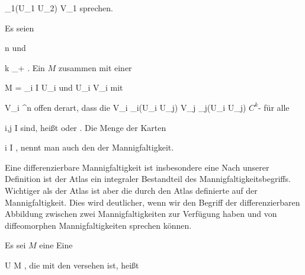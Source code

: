 \mavergleichskette
{\vergleichskette
{ \alpha_1(U_1 \cap U_2)
}
{ \subseteq }{ V_1
}
{  }{
}
{    }{
}
{   }{
}
}
{}{}{}
sprechen.

{}
{

Es seien

\mavergleichskette
{\vergleichskette
{ n
}
{ \in }{ \N
}
{  }{
}
{    }{
}
{   }{
}
}
{}{}{}
und

\mavergleichskette
{\vergleichskette
{ k
}
{ \in }{ \overline{ \N }_+
}
{  }{
}
{    }{
}
{   }{
}
}
{}{}{.}
Ein
$M$ zusammen mit einer

\mavergleichskette
{\vergleichskette
{ M
}
{ = }{ \bigcup_{i \in I} U_i
}
{  }{
}
{    }{
}
{   }{
}
}
{}{}{}
und
 {U_i } { V_i
} {}
mit

\mavergleichskette
{\vergleichskette
{ V_i
}
{ \subseteq }{ \R^n
}
{  }{
}
{    }{
}
{   }{
}
}
{}{}{}
offen derart, dass die
 {V_i \cap \alpha_i(U_i \cap U_j) } { V_j \cap \alpha_j(U_i \cap U_j)
} {}
$C^k$-
für alle

\mavergleichskette
{\vergleichskette
{ i,j
}
{ \in }{ I
}
{  }{
}
{    }{
}
{   }{
}
}
{}{}{}
sind, heißt
oder 
 {} {.} Die Menge der Karten

 {}
 {i \in I} {}
 {} {} {} {,}
nennt man auch den
der Mannigfaltigkeit.

}

Eine differenzierbare Mannigfaltigkeit ist insbesondere eine
 Nach unserer Definition ist der Atlas ein integraler Bestandteil des Mannigfaltigkeitsbegriffs. Wichtiger als der Atlas ist aber die durch den Atlas definierte  {} auf der Mannigfaltigkeit. Dies wird deutlicher, wenn wir den Begriff der differenzierbaren Abbildung zwischen zwei Mannigfaltigkeiten zur Verfügung haben und von diffeomorphen Mannigfaltigkeiten sprechen können.

{}
{

Es sei $M$ eine
Eine

\mavergleichskette
{\vergleichskette
{ U
}
{ \subseteq }{ M
}
{  }{
}
{    }{
}
{   }{
}
}
{}{}{,}
die mit den
versehen ist, heißt 

}

